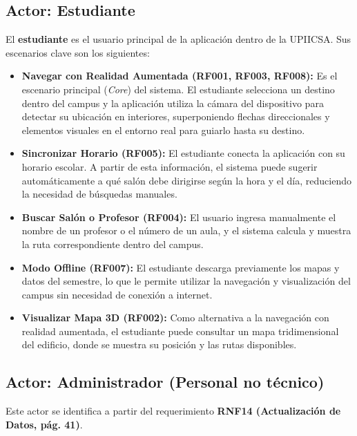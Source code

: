 \begin{flushleft}
	\subsection*{Actor: Estudiante}
	
	El \textbf{estudiante} es el usuario principal de la aplicación dentro de la UPIICSA. Sus escenarios clave son los siguientes:
	
	\begin{itemize}
		\item \textbf{Navegar con Realidad Aumentada (RF001, RF003, RF008):}  
		Es el escenario principal (\textit{Core}) del sistema. El estudiante selecciona un destino dentro del campus y la aplicación utiliza la cámara del dispositivo para detectar su ubicación en interiores, superponiendo flechas direccionales y elementos visuales en el entorno real para guiarlo hasta su destino.
		
		\item \textbf{Sincronizar Horario (RF005):}  
		El estudiante conecta la aplicación con su horario escolar. A partir de esta información, el sistema puede sugerir automáticamente a qué salón debe dirigirse según la hora y el día, reduciendo la necesidad de búsquedas manuales.
		
		\item \textbf{Buscar Salón o Profesor (RF004):}  
		El usuario ingresa manualmente el nombre de un profesor o el número de un aula, y el sistema calcula y muestra la ruta correspondiente dentro del campus.
		
		\item \textbf{Modo Offline (RF007):}  
		El estudiante descarga previamente los mapas y datos del semestre, lo que le permite utilizar la navegación y visualización del campus sin necesidad de conexión a internet.
		
		\item \textbf{Visualizar Mapa 3D (RF002):}  
		Como alternativa a la navegación con realidad aumentada, el estudiante puede consultar un mapa tridimensional del edificio, donde se muestra su posición y las rutas disponibles.
	\end{itemize}
	
	\subsection*{Actor: Administrador (Personal no técnico)}
	
	Este actor se identifica a partir del requerimiento \textbf{RNF14 (Actualización de Datos, pág. 41)}.
	

\end{flushleft}
